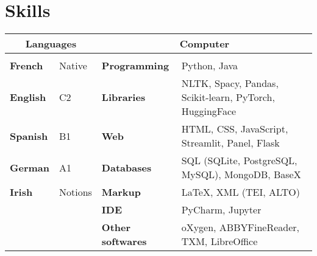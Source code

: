 \documentclass[11pt,a4paper,sans]{moderncv} %
\begin{document}
\section{Skills}
    \small
    \setlength{\tabcolsep}{5pt}
    \begin{tabular}{ll|ll}
    \multicolumn{2}{c}{\textbf{Languages}}   & \multicolumn{2}{c}{\textbf{Computer}}                                             \\
    \hline \\
    \textbf{French}  & Native & \textbf{Programming}       & Python, Java                                            \\
    \textbf{English}   & C2                & \textbf{Libraries}          & NLTK, Spacy, Pandas, Scikit-learn, PyTorch, HuggingFace \\
    \textbf{Spanish}  & B1                & \textbf{Web}                 & HTML, CSS, JavaScript, Streamlit, Panel, Flask          \\
    \textbf{German}  & A1                & \textbf{Databases}    & SQL (SQLite, PostgreSQL, MySQL), MongoDB, BaseX         \\
    \textbf{Irish} & Notions           & \textbf{Markup} & \LaTeX, XML (TEI, ALTO)                  \\
              &                   & \textbf{IDE}                 & PyCharm, Jupyter                                        \\
              &                   & \textbf{Other softwares}    & oXygen, ABBYFineReader, TXM, LibreOffice               
    \end{tabular}






\end{document}
